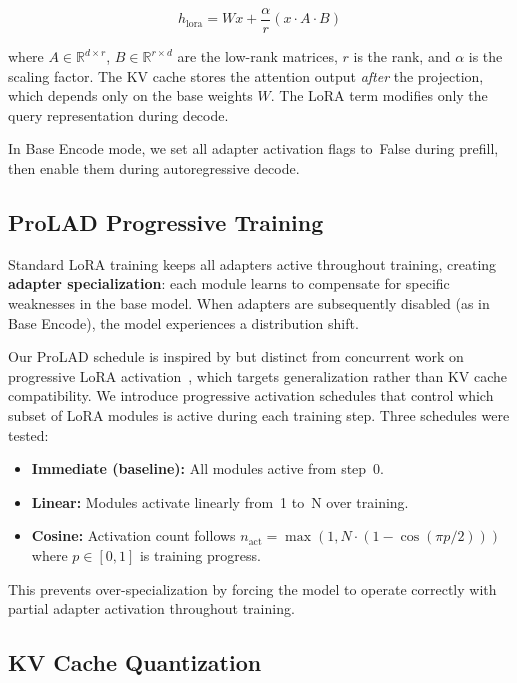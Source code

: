 \documentclass[11pt]{article}
\begin{document}
\[
h_{\text{lora}} = Wx + \frac{\alpha}{r} (x \cdot A \cdot B)
\]

where $A \in \mathbb{R}^{d \times r}$, $B \in \mathbb{R}^{r \times d}$ are the low-rank matrices, $r$ is the rank, and $\alpha$ is the scaling factor. The KV cache stores the attention output \emph{after} the projection, which depends only on the base weights $W$. The LoRA term modifies only the query representation during decode.

In Base Encode mode, we set all adapter activation flags to~False during prefill, then enable them during autoregressive decode.

\subsection{ProLAD Progressive Training}
\label{sec:prolad}

Standard LoRA training keeps all adapters active throughout training, creating \textbf{adapter specialization}: each module learns to compensate for specific weaknesses in the base model. When adapters are subsequently disabled (as in Base Encode), the model experiences a distribution shift.

Our ProLAD schedule is inspired by but distinct from concurrent work on progressive LoRA activation~\cite{coto}, which targets generalization rather than KV cache compatibility. We introduce progressive activation schedules that control which subset of LoRA modules is active during each training step. Three schedules were tested:

\begin{itemize}
    \item \textbf{Immediate (baseline):} All modules active from step~0.
    \item \textbf{Linear:} Modules activate linearly from~1 to~N over training.
    \item \textbf{Cosine:} Activation count follows $n_{\text{act}} = \max(1, N \cdot (1 - \cos(\pi p / 2)))$ where $p \in [0, 1]$ is training progress.
\end{itemize}

This prevents over-specialization by forcing the model to operate correctly with partial adapter activation throughout training.

\subsection{KV Cache Quantization}
\label{sec:quantization}
\end{document}
